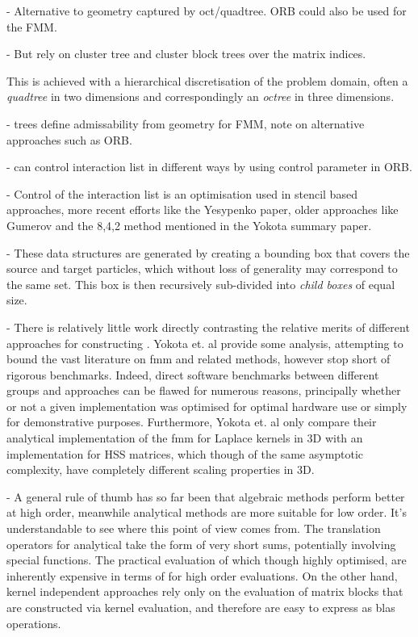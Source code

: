 - Alternative to geometry captured by oct/quadtree. ORB could also be used for the FMM.

- But rely on cluster tree and cluster block trees over the matrix indices.

This is achieved with a hierarchical discretisation of the problem domain, often a \textit{quadtree} in two dimensions and correspondingly an \textit{octree} in three dimensions.

- trees define admissability from geometry for FMM, note on alternative approaches such as ORB.

- can control interaction list in different ways by using control parameter in ORB.

- Control of the interaction list is an optimisation used in stencil based approaches, more recent efforts like the Yesypenko paper, older approaches like Gumerov and the 8,4,2 method mentioned in the Yokota summary paper.

- These data structures are generated by creating a bounding box that covers the source and target particles, which without loss of generality may correspond to the same set. This box is then recursively sub-divided into \textit{child boxes} of equal size.

- There is relatively little work directly contrasting the relative merits of different approaches for constructing . Yokota et. al \cite{yokota2015fast} provide some analysis, attempting to bound the vast literature on \acrshort{fmm} and related methods, however stop short of rigorous benchmarks. Indeed, direct software benchmarks between different groups and approaches can be flawed for numerous reasons, principally whether or not a given implementation was optimised for optimal hardware use or simply for demonstrative purposes. Furthermore, Yokota et. al only compare their analytical implementation of the \acrshort{fmm} for Laplace kernels in 3D with an implementation for HSS matrices, which though of the same asymptotic complexity, have completely different scaling properties in 3D.

- A general rule of thumb has so far been that algebraic methods perform better at high order, meanwhile analytical methods are more suitable for low order. It's understandable to see where this point of view comes from. The translation operators for analytical  take the form of very short sums, potentially involving special functions. The practical evaluation of which though highly optimised, are inherently expensive in terms of  for high order evaluations. On the other hand, kernel independent approaches rely only on the evaluation of matrix blocks that are constructed via kernel evaluation, and therefore are easy to express as \acrshort{blas} operations.

